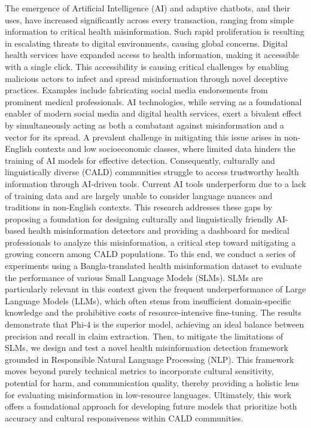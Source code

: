 \documentclass[]{article}
\begin{document}
The emergence of Artificial Intelligence (AI) and adaptive chatbots, and their uses, have increased significantly across every transaction, ranging from simple information to critical health misinformation. Such rapid proliferation is resulting in escalating threats to digital environments, causing global concerns. Digital health services have expanded access to health information, making it accessible with a single click. This accessibility is causing critical challenges by enabling malicious actors to infect and spread misinformation through novel deceptive practices. Examples include fabricating social media endorsements from prominent medical professionals. AI technologies, while serving as a foundational enabler of modern social media and digital health services, exert a bivalent effect by simultaneously acting as both a combatant against misinformation and a vector for its spread. A prevalent challenge in mitigating this issue arises in non-English contexts and low socioeconomic classes, where limited data hinders the training of AI models for effective detection. Consequently, culturally and linguistically diverse (CALD) communities struggle to access trustworthy health information through AI-driven tools. Current AI tools underperform due to a lack of training data and are largely unable to consider language nuances and traditions in non-English contexts. This research addresses these gaps by proposing a foundation for designing culturally and linguistically friendly AI-based health misinformation detectors and providing a dashboard for medical professionals to analyze this misinformation, a critical step toward mitigating a growing concern among CALD populations. To this end, we conduct a series of experiments using a Bangla-translated health misinformation dataset to evaluate the performance of various Small Language Models (SLMs). SLMs are particularly relevant in this context given the frequent underperformance of Large Language Models (LLMs), which often stems from insufficient domain-specific knowledge and the prohibitive costs of resource-intensive fine-tuning. The results demonstrate that Phi-4 is the superior model, achieving an ideal balance between precision and recall in claim extraction. Then, to mitigate the limitations of SLMs, we design and test a novel health misinformation detection framework grounded in Responsible Natural Language Processing (NLP). This framework moves beyond purely technical metrics to incorporate cultural sensitivity, potential for harm, and communication quality, thereby providing a holistic lens for evaluating misinformation in low-resource languages. Ultimately, this work offers a foundational approach for developing future models that prioritize both accuracy and cultural responsiveness within CALD communities. 
\end{document}
